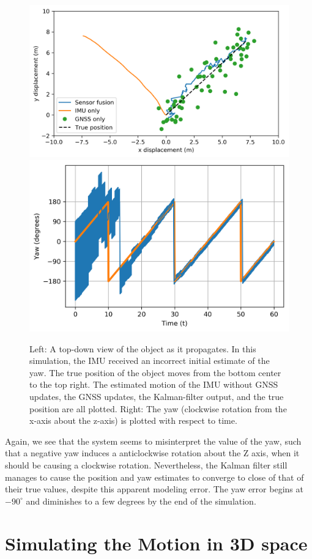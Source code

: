 \documentclass[10pt]{article}
\begin{document}
\begin{figure}
  \centering
    \includegraphics[height=2 in]{../images/position-with-initial-estimate-wrong.png}
    \includegraphics[height=2 in]{../images/yaw-with-large-initial-estimate-wrong.png}
  \caption{\label{ref:2d-wrong-initial}Left: A top-down view of the object as it propagates. In this simulation, the IMU received an incorrect initial estimate of the yaw. The true position of the object moves from the bottom center to the top right. The estimated motion of the IMU without GNSS updates, the GNSS updates, the Kalman-filter output, and the true position are all plotted. Right: The yaw (clockwise rotation from the x-axis about the z-axis) is plotted with respect to time.}
\end{figure}

Again, we see that the system seems to misinterpret the value of the yaw, such that a negative yaw induces a anticlockwise rotation about the Z axis, when it should be causing a clockwise rotation. Nevertheless, the Kalman filter still manages to cause the position and yaw estimates to converge to close of that of their true values, despite this apparent modeling error. The yaw error begins at $-90^\circ$ and diminishes to a few degrees by the end of the simulation.

\section{Simulating the Motion in 3D space}
\end{document}
